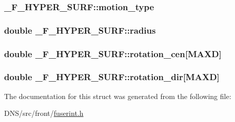 \subsubsection[{\texorpdfstring{motion\+\_\+type}{motion_type}}]{ \+\_\+\+F\+\_\+\+H\+Y\+P\+E\+R\+\_\+\+S\+U\+R\+F\+::motion\+\_\+type}\hypertarget{struct___f___h_y_p_e_r___s_u_r_f_a0bd1e6abfaa067f7f6bcd9f10c719e56}{}\label{struct___f___h_y_p_e_r___s_u_r_f_a0bd1e6abfaa067f7f6bcd9f10c719e56}
\subsubsection[{\texorpdfstring{radius}{radius}}]{\setlength{\rightskip}{0pt plus 5cm}double \+\_\+\+F\+\_\+\+H\+Y\+P\+E\+R\+\_\+\+S\+U\+R\+F\+::radius}\hypertarget{struct___f___h_y_p_e_r___s_u_r_f_ae7bc2edb7b3232719c3ef6e5ef1b83ad}{}\label{struct___f___h_y_p_e_r___s_u_r_f_ae7bc2edb7b3232719c3ef6e5ef1b83ad}
\subsubsection[{\texorpdfstring{rotation\+\_\+cen}{rotation_cen}}]{\setlength{\rightskip}{0pt plus 5cm}double \+\_\+\+F\+\_\+\+H\+Y\+P\+E\+R\+\_\+\+S\+U\+R\+F\+::rotation\+\_\+cen\mbox{[}{\bf M\+A\+XD}\mbox{]}}\hypertarget{struct___f___h_y_p_e_r___s_u_r_f_a3e825dfe04eac5ea4bb834ddaf7d04dc}{}\label{struct___f___h_y_p_e_r___s_u_r_f_a3e825dfe04eac5ea4bb834ddaf7d04dc}
\subsubsection[{\texorpdfstring{rotation\+\_\+dir}{rotation_dir}}]{\setlength{\rightskip}{0pt plus 5cm}double \+\_\+\+F\+\_\+\+H\+Y\+P\+E\+R\+\_\+\+S\+U\+R\+F\+::rotation\+\_\+dir\mbox{[}{\bf M\+A\+XD}\mbox{]}}\hypertarget{struct___f___h_y_p_e_r___s_u_r_f_a8e96b8a0dcbef6018f180c1967d5e028}{}\label{struct___f___h_y_p_e_r___s_u_r_f_a8e96b8a0dcbef6018f180c1967d5e028}


The documentation for this struct was generated from the following file\+:\begin{DoxyCompactItemize}
\item 
D\+N\+S/src/front/\hyperlink{fuserint_8h}{fuserint.\+h}\end{DoxyCompactItemize}
